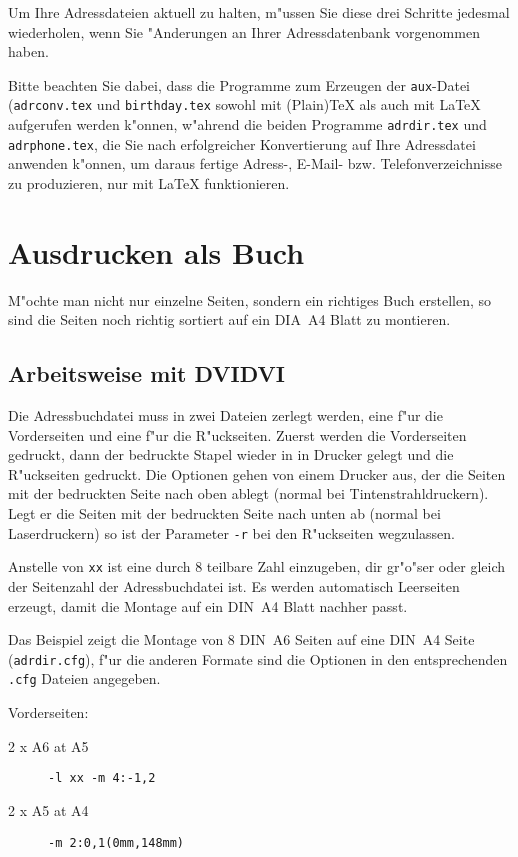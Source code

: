 \documentclass{article}
\newcommand*{\File}[1]{\texttt{#1}}
\begin{document}
Um Ihre Adressdateien aktuell zu halten, m"ussen Sie diese drei 
Schritte jedesmal wiederholen, wenn Sie "Anderungen an Ihrer 
Adressdatenbank vorgenommen haben.

Bitte beachten Sie dabei, dass die Programme zum Erzeugen der
\File{aux}-Datei (\File{adrconv.tex} und \File{birthday.tex} 
sowohl mit (Plain)\TeX{} als auch mit \LaTeX{} aufgerufen
werden k"onnen, w"ahrend die beiden Programme \File{adrdir.tex} und
\File{adrphone.tex}, die Sie nach erfolgreicher Konvertierung auf Ihre
Adressdatei anwenden k"onnen, um daraus fertige Adress-, E-Mail- bzw.
Telefonverzeichnisse zu produzieren, nur mit \LaTeX{} funktionieren.

\section{Ausdrucken als Buch}

M"ochte man nicht nur einzelne Seiten, sondern ein richtiges Buch erstellen, so sind die Seiten noch richtig sortiert auf ein DIA~A4 Blatt zu montieren.

\subsection{Arbeitsweise mit DVIDVI}

Die Adressbuchdatei muss in zwei Dateien zerlegt werden, eine f"ur die
Vorderseiten und eine f"ur die R"uckseiten. Zuerst werden die Vorderseiten gedruckt, dann der bedruckte Stapel wieder in in Drucker gelegt und die R"uckseiten gedruckt. Die Optionen gehen von einem Drucker aus, der die Seiten mit der bedruckten Seite nach oben ablegt (normal bei Tintenstrahldruckern). Legt er die Seiten mit der bedruckten Seite nach unten ab (normal bei Laserdruckern) so ist der Parameter \texttt{-r} bei den R"uckseiten wegzulassen.

Anstelle von \texttt{xx} ist eine durch $8$ teilbare Zahl einzugeben, dir
gr"o"ser oder gleich der Seitenzahl der Adressbuchdatei ist. Es werden automatisch Leerseiten erzeugt, damit die Montage auf ein DIN~A4 Blatt nachher passt.

Das Beispiel zeigt die Montage von 8 DIN~A6 Seiten auf eine DIN~A4 Seite (\texttt{adrdir.cfg}), f"ur die anderen Formate sind die Optionen in den entsprechenden \texttt{.cfg} Dateien angegeben.

\noindent Vorderseiten:

\begin{description}
\item [2 x A6 at A5] \texttt{-l xx -m 4:-1,2}
\item [2 x A5 at A4] \texttt{-m 2:0,1(0mm,148mm)}
\end{description}
\end{document}
